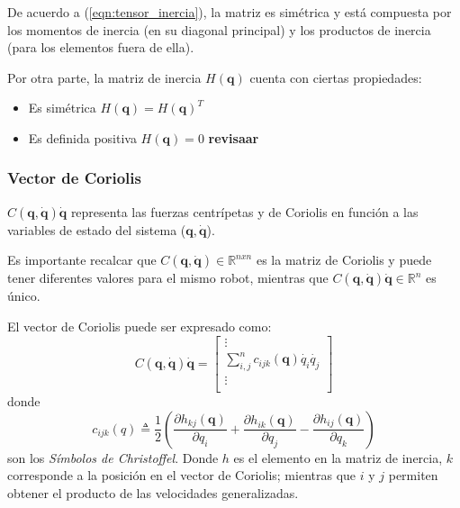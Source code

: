     De acuerdo a (\ref{eqn:tensor_inercia}), la matriz es simétrica y está compuesta por los momentos de inercia (en su diagonal principal) y los productos de inercia 
    (para los elementos fuera de ella). 

    Por otra parte, la matriz de inercia $H(\boldsymbol{q})$ cuenta con ciertas propiedades:
    \begin{itemize}
        \item Es simétrica $H(\boldsymbol{q}) = H(\boldsymbol{q})^T$
        \item Es definida positiva $H(\boldsymbol{q})=0$ \textbf{revisaar}
    \end{itemize}

    \subsubsection{Vector de Coriolis}
    $C(\boldsymbol{q}, \boldsymbol{\dot{q}}) \boldsymbol{\dot{q}}$ representa las fuerzas centrípetas y de Coriolis 
    en función a las variables de estado del sistema ($\boldsymbol{q}, \boldsymbol{\dot{q}}$). 
    
    Es importante recalcar que $C(\boldsymbol{q}, \boldsymbol{\dot{q}}) \in \mathbb{R}^{nxn}$ es la matriz de Coriolis y puede tener diferentes valores para el mismo robot, 
    mientras que $C(\boldsymbol{q}, \boldsymbol{\dot{q}}) \boldsymbol{\dot{q}} \in \mathbb{R}^n$ es único.

    El vector de Coriolis puede ser expresado como:
    \begin{equation}
        \label{eqn:coriolis_vector}
        C(\boldsymbol{q}, \boldsymbol{\dot{q}}) \boldsymbol{\dot{q}} = \begin{bmatrix} \vdots\\
        \sum_{i,j}^{n} c_{ijk}(\boldsymbol{q})\dot{q_{i}}\dot{q_{j}}   \\  \vdots\\ \end{bmatrix}
    \end{equation}
    donde 
    \begin{equation}
        \label{eqn:christoffel}
        c_{ijk}(q) \triangleq \frac{1}{2}\left( \frac{\partial h_{kj}(\boldsymbol{q})}{\partial q_{i}}+\frac{\partial h_{ik}(\boldsymbol{q})}{\partial q_{j}}
        -\frac{\partial h_{ij}(\boldsymbol{q})}{\partial q_{k}} \right)
    \end{equation}
    son los \emph{Símbolos de Christoffel}. Donde $h$ es el elemento en la matriz de inercia, $k$ corresponde a la posición en el vector de Coriolis; 
    mientras que $i$ y $j$ permiten obtener el producto de las velocidades generalizadas. 

